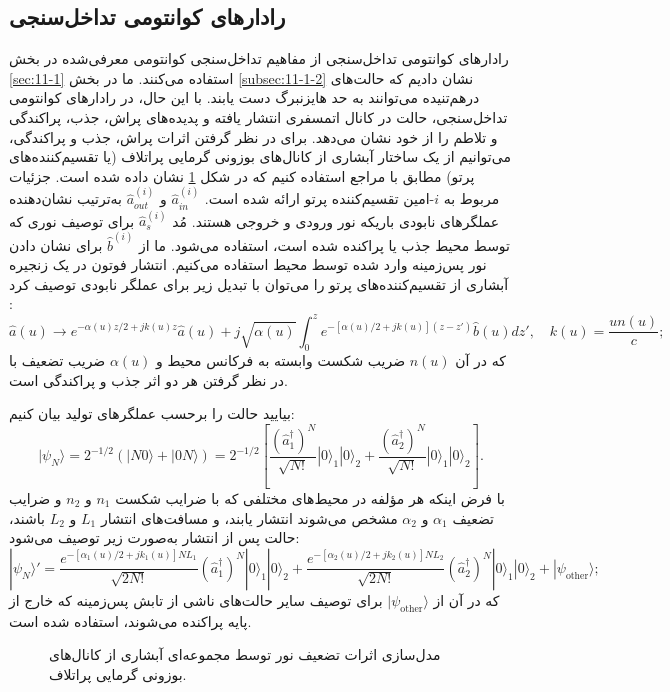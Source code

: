 \subsection{رادارهای کوانتومی تداخل‌سنجی}
\label{subsec:11-4-1}
رادارهای کوانتومی تداخل‌سنجی از مفاهیم تداخل‌سنجی کوانتومی معرفی‌شده در بخش \ref{sec:11-1} استفاده می‌کنند. ما در بخش \ref{subsec:11-1-2} نشان دادیم که حالت‌های  درهم‌تنیده می‌توانند به حد هایزنبرگ دست یابند. با این حال، در رادارهای کوانتومی تداخل‌سنجی، حالت  در کانال اتمسفری انتشار یافته و پدیده‌های پراش، جذب، پراکندگی و تلاطم را از خود نشان می‌دهد. برای در نظر گرفتن اثرات پراش، جذب و پراکندگی، می‌توانیم از یک ساختار آبشاری از کانال‌های بوزونی گرمایی پراتلاف (یا تقسیم‌کننده‌های پرتو) مطابق با مراجع \cite{7,35,36} استفاده کنیم که در شکل \ref{fig:11-11} نشان داده شده است. جزئیات مربوط به $i$-امین تقسیم‌کننده پرتو ارائه شده است. $\hat{a}_{in}^{(i)}$ و $\hat{a}_{out}^{(i)}$ به‌ترتیب نشان‌دهنده عملگرهای نابودی باریکه نور ورودی و خروجی هستند. مُد $\hat{a}_{s}^{(i)}$ برای توصیف نوری که توسط محیط جذب یا پراکنده شده است، استفاده می‌شود. ما از $\hat{b}^{(i)}$ برای نشان دادن نور پس‌زمینه وارد شده توسط محیط استفاده می‌کنیم. انتشار فوتون در یک زنجیره آبشاری از تقسیم‌کننده‌های پرتو را می‌توان با تبدیل زیر برای عملگر نابودی توصیف کرد \cite{7}:
\begin{equation}
	\hat{a}(u) \to e^{-\alpha(u)z/2 + jk(u)z} \hat{a}(u) + j \sqrt{\alpha(u)} \int_{0}^{z} e^{-[\alpha(u)/2 + jk(u)](z-z')} \hat{b}(u) dz', \quad k(u) = \frac{u n(u)}{c};
	\label{eq:11-80}
\end{equation}
که در آن $n(u)$ ضریب شکست وابسته به فرکانس محیط و $\alpha(u)$ ضریب تضعیف با در نظر گرفتن هر دو اثر جذب و پراکندگی است.

بیایید حالت  را برحسب عملگرهای تولید بیان کنیم:
\begin{equation}
	|\psi_N\rangle = 2^{-1/2}(|N0\rangle + |0N\rangle) = 2^{-1/2} \left[ \frac{(\hat{a}_1^\dagger)^N}{\sqrt{N!}} |0\rangle_1 |0\rangle_2 + \frac{(\hat{a}_2^\dagger)^N}{\sqrt{N!}} |0\rangle_1 |0\rangle_2 \right].
	\label{eq:11-81}
\end{equation}
با فرض اینکه هر مؤلفه در محیط‌های مختلفی که با ضرایب شکست $n_1$ و $n_2$ و ضرایب تضعیف $\alpha_1$ و $\alpha_2$ مشخص می‌شوند انتشار یابند، و مسافت‌های انتشار $L_1$ و $L_2$ باشند، حالت  پس از انتشار به‌صورت زیر توصیف می‌شود:
\begin{equation}
	|\psi_N\rangle' = \frac{e^{-[\alpha_1(u)/2 + jk_1(u)]NL_1}}{\sqrt{2N!}} (\hat{a}_1^\dagger)^N |0\rangle_1 |0\rangle_2 + \frac{e^{-[\alpha_2(u)/2 + jk_2(u)]NL_2}}{\sqrt{2N!}} (\hat{a}_2^\dagger)^N |0\rangle_1 |0\rangle_2 + |\psi_{\text{other}}\rangle;
	\label{eq:11-82}
\end{equation}
که در آن از $|\psi_{\text{other}}\rangle$ برای توصیف سایر حالت‌های ناشی از تابش پس‌زمینه که خارج از پایه  پراکنده می‌شوند، استفاده شده است.

\begin{figure}[ht]
	\centering
	\caption{مدل‌سازی اثرات تضعیف نور توسط مجموعه‌ای آبشاری از کانال‌های بوزونی گرمایی پراتلاف.}
	\label{fig:11-11}
\end{figure}








